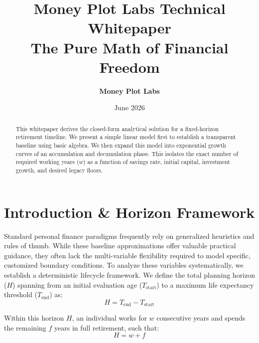 \documentclass[11pt,letterpaper]{article}
\title{\vspace{-20pt}\textbf{\color{mpdark}Money Plot Labs Technical Whitepaper \\ The Pure Math of Financial Freedom}}
\author{\textbf{Money Plot Labs}}
\date{June 2026}
\begin{document}
\maketitle

\begin{abstract}
\vspace{-5pt}
This whitepaper derives the closed-form analytical solution for a fixed-horizon retirement timeline. We present a simple linear model first to establish a transparent baseline using basic algebra. We then expand this model into exponential growth curves of an accumulation and decumulation phase. This isolates the exact number of required working years ($w$) as a function of savings rate, initial capital, investment growth, and desired legacy floors.
\end{abstract}

\section{Introduction \& Horizon Framework}
Standard personal finance paradigms frequently rely on generalized heuristics and rules of thumb. While these baseline approximations offer valuable practical guidance, they often lack the multi-variable flexibility required to model specific, customized boundary conditions. To analyze these variables systematically, we establish a deterministic lifecycle framework. We define the total planning horizon ($H$) spanning from an initial evaluation age ($T_{\text{start}}$) to a maximum life expectancy threshold ($T_{\text{end}}$) as:
\begin{equation}
H = T_{\text{end}} - T_{\text{start}}
\end{equation}

Within this horizon $H$, an individual works for $w$ consecutive years and spends the remaining $f$ years in full retirement, such that:
\begin{equation}
H = w + f
\end{equation}
\end{document}
